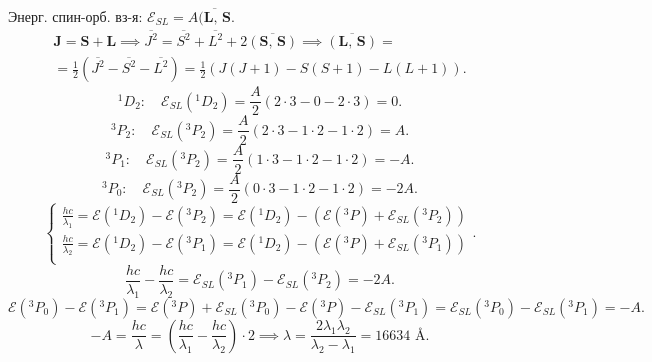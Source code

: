 \documentclass[a4paper]{article}
\begin{document}
\begin{sol}
	Энерг. спин-орб. вз-я: $\mathcal{E}_{SL}=A \overline{(\mathbf{L},\,\mathbf{S}}$.
\begin{multline*}
	\mathbf{J}=\mathbf{S}+\mathbf{L}\implies
	\overline{J^2}= \overline{S^2}+\overline{L^2}+
	2 \overline{(\mathbf{S},\,\mathbf{S})}\implies
	\overline{(\mathbf{L},\,\mathbf{S})}=\\=\frac{1}{2}
	\left(\overline{J^2}-\overline{S^2}-\overline{L^2}\right)=
	\frac{1}{2} \left( J(J+1)-S(S+1)-L(L+1) \right) 
.\end{multline*} 
\[
	^1D_2:\quad \mathcal{E}_{SL}(^1D_2)=\frac{A}{2}(2\cdot 3-
	0-2\cdot 3)=0
.\] 
\[
	^3 P_2:\quad \mathcal{E}_{SL} (^3P_2)=
	\frac{A}{2}(2 \cdot 3-1 \cdot 2- 1\cdot 2)=A
.\] 
\[
	^3 P_1:\quad \mathcal{E}_{SL} (^3P_2)=
	\frac{A}{2}(1 \cdot 3-1 \cdot 2- 1\cdot 2)=-A
.\] 
\[
	^3 P_0:\quad \mathcal{E}_{SL} (^3P_2)=
	\frac{A}{2}(0 \cdot 3-1 \cdot 2- 1\cdot 2)=-2A
.\] 
\[
\left\{
\begin{aligned}
	\frac{hc}{\lambda_1}= \mathcal{E}(^1D_2)-\mathcal{E}(^3P_2)=
	\mathcal{E}(^1D_2)-\left( \mathcal{E}(^3P)+\mathcal{E}_{SL}(
	^3P_2)\right) \\
	\frac{hc}{\lambda_2}= \mathcal{E}(^1D_2)-\mathcal{E}(^3P_1)=
	\mathcal{E}(^1D_2)-\left( \mathcal{E}(^3P)+\mathcal{E}_{SL}(
	^3P_1)\right) \\
\end{aligned}
\right.
.\] 
\[
	\frac{hc}{\lambda_1}-\frac{hc}{\lambda_2}=\mathcal{E}_{SL}
	(^3P_1)- \mathcal{E}_{SL}(^3P_2)=-2A
.\] 
\[
	\mathcal{E}(^3P_0)-\mathcal{E}(^3P_1)=
	\mathcal{E}(^3P)+\mathcal{E}_{SL}(^3P_0)-
	\mathcal{E}(^3P)-\mathcal{E}_{SL}(^3P_1)=
	\mathcal{E}_{SL}(^3P_0)-\mathcal{E}_{SL}(^3P_1)=-A
.\] 
\[
	-A= \frac{hc}{\lambda}= \left( \frac{hc}{\lambda_1}-
	\frac{hc}{\lambda_2}\right) \cdot 2 \implies
	\lambda=\frac{2\lambda_1 \lambda_2}{\lambda_2-\lambda_1}=
	16634 \text{ \AA}
.\] 
\end{sol}
\end{document}
